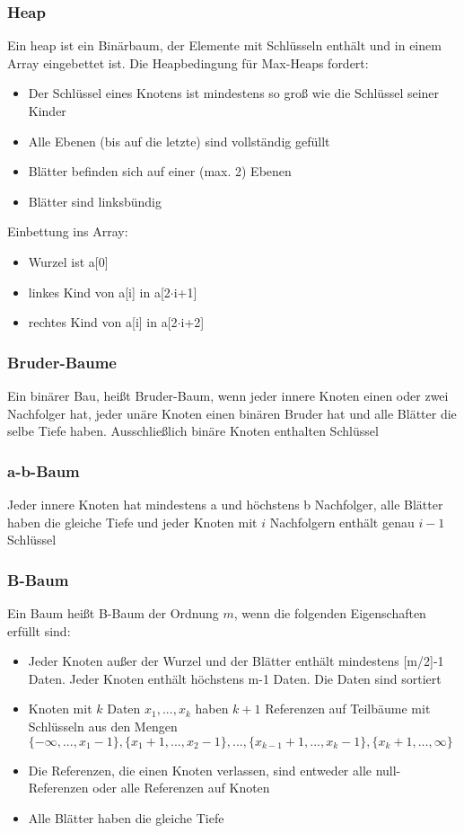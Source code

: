 \subsubsection{Heap}
	Ein heap ist ein Binärbaum, der Elemente mit Schlüsseln enthält und in einem Array eingebettet ist. Die Heapbedingung für Max-Heaps fordert:
	\begin{itemize}
	  \item Der Schlüssel eines Knotens ist mindestens so groß wie die Schlüssel seiner Kinder
	  \item Alle Ebenen (bis auf die letzte) sind vollständig gefüllt
	  \item Blätter befinden sich auf einer (max. 2) Ebenen
	  \item Blätter sind linksbündig
	\end{itemize}
	Einbettung ins Array:
	\begin{itemize}
	  \item Wurzel ist a[0]
	  \item linkes Kind von a[i] in a[2$\cdot$i+1]
	  \item rechtes Kind von a[i] in a[2$\cdot$i+2]
	\end{itemize}
\subsubsection{Bruder-Baume}
	Ein binärer Bau, heißt Bruder-Baum, wenn jeder innere Knoten einen oder zwei Nachfolger hat, jeder unäre Knoten einen binären Bruder hat und alle Blätter die selbe Tiefe haben. Ausschließlich binäre Knoten enthalten Schlüssel
\subsubsection{a-b-Baum}
	Jeder innere Knoten hat mindestens a und höchstens b Nachfolger, alle Blätter haben die gleiche Tiefe und jeder Knoten mit $i$ Nachfolgern enthält genau $i-1$ Schlüssel
\subsubsection{B-Baum}
	Ein Baum heißt B-Baum der Ordnung $m$, wenn die folgenden Eigenschaften erfüllt sind:
	\begin{itemize}
	  \item Jeder Knoten außer der Wurzel und der Blätter enthält mindestens [m/2]-1 Daten. Jeder Knoten enthält höchstens m-1 Daten. Die Daten sind sortiert
	  \item Knoten mit $k$ Daten $x_1,...,x_k$ haben $k+1$ Referenzen auf Teilbäume mit Schlüsseln aus den Mengen $\{-\infty,...,x_1-1\},\{x_1+1,...,x_2-1\},...,\{x_{k-1}+1,...,x_{k}-1\},\{x_k+1,...,\infty\}$
	  \item Die Referenzen, die einen Knoten verlassen, sind entweder alle null-Referenzen oder alle Referenzen auf Knoten
	  \item Alle Blätter haben die gleiche Tiefe 
	\end{itemize}

